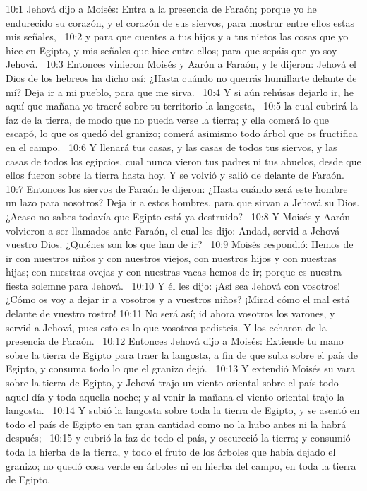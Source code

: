 10:1 Jehová dijo a Moisés: Entra a la presencia de Faraón; porque yo he endurecido su corazón, y el corazón de sus siervos, para mostrar entre ellos estas mis señales,  
10:2 y para que cuentes a tus hijos y a tus nietos las cosas que yo hice en Egipto, y mis señales que hice entre ellos; para que sepáis que yo soy Jehová.  
10:3 Entonces vinieron Moisés y Aarón a Faraón, y le dijeron: Jehová el Dios de los hebreos ha dicho así: ¿Hasta cuándo no querrás humillarte delante de mí? Deja ir a mi pueblo, para que me sirva.  
10:4 Y si aún rehúsas dejarlo ir, he aquí que mañana yo traeré sobre tu territorio la langosta,  
10:5 la cual cubrirá la faz de la tierra, de modo que no pueda verse la tierra; y ella comerá lo que escapó, lo que os quedó del granizo; comerá asimismo todo árbol que os fructifica en el campo.  
10:6 Y llenará tus casas, y las casas de todos tus siervos, y las casas de todos los egipcios, cual nunca vieron tus padres ni tus abuelos, desde que ellos fueron sobre la tierra hasta hoy. Y se volvió y salió de delante de Faraón.  
10:7 Entonces los siervos de Faraón le dijeron: ¿Hasta cuándo será este hombre un lazo para nosotros? Deja ir a estos hombres, para que sirvan a Jehová su Dios. ¿Acaso no sabes todavía que Egipto está ya destruido?  
10:8 Y Moisés y Aarón volvieron a ser llamados ante Faraón, el cual les dijo: Andad, servid a Jehová vuestro Dios. ¿Quiénes son los que han de ir?  
10:9 Moisés respondió: Hemos de ir con nuestros niños y con nuestros viejos, con nuestros hijos y con nuestras hijas; con nuestras ovejas y con nuestras vacas hemos de ir; porque es nuestra fiesta solemne para Jehová.  
10:10 Y él les dijo: ¡Así sea Jehová con vosotros! ¿Cómo os voy a dejar ir a vosotros y a vuestros niños? ¡Mirad cómo el mal está delante de vuestro rostro! 
10:11 No será así; id ahora vosotros los varones, y servid a Jehová, pues esto es lo que vosotros pedisteis. Y los echaron de la presencia de Faraón.  
10:12 Entonces Jehová dijo a Moisés: Extiende tu mano sobre la tierra de Egipto para traer la langosta, a fin de que suba sobre el país de Egipto, y consuma todo lo que el granizo dejó.  
10:13 Y extendió Moisés su vara sobre la tierra de Egipto, y Jehová trajo un viento oriental sobre el país todo aquel día y toda aquella noche; y al venir la mañana el viento oriental trajo la langosta.  
10:14 Y subió la langosta sobre toda la tierra de Egipto, y se asentó en todo el país de Egipto en tan gran cantidad como no la hubo antes ni la habrá después;  
10:15 y cubrió la faz de todo el país, y oscureció la tierra; y consumió toda la hierba de la tierra, y todo el fruto de los árboles que había dejado el granizo; no quedó cosa verde en árboles ni en hierba del campo, en toda la tierra de Egipto.  
